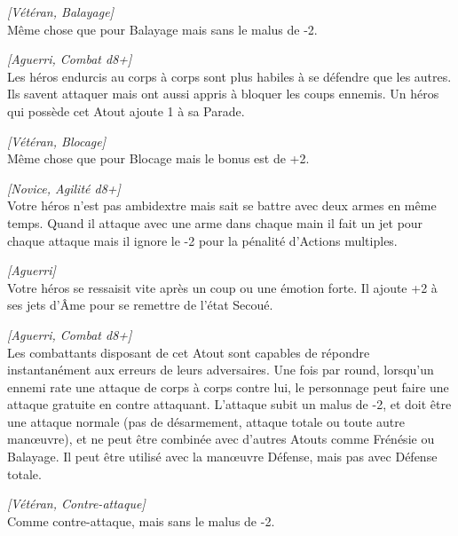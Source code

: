 \begin{description}[align=left]
    \item [Grand balayage]
    	\emph{[Vétéran, Balayage]}\\
        Même chose que pour Balayage mais sans le malus de -2.

    \item [Blocage]
    	\emph{[Aguerri, Combat d8+]}\\
        Les héros endurcis au corps à corps sont plus habiles à se défendre que les autres. Ils savent attaquer mais ont aussi appris à bloquer les coups ennemis. Un héros qui possède cet Atout ajoute 1 à sa Parade.

    \item [Grand blocage]
    	\emph{[Vétéran, Blocage]}\\
        Même chose que pour Blocage mais le bonus est de +2.

    \item [Combat à deux armes]
    	\emph{[Novice, Agilité d8+]}\\
        Votre héros n’est pas ambidextre mais sait se battre avec deux armes en même temps. Quand il attaque avec une arme dans chaque main il fait un jet pour chaque attaque mais il ignore le -2 pour la pénalité d’Actions multiples.

    \item [Combatif]
    	\emph{[Aguerri]}\\
        Votre héros se ressaisit vite après un coup ou une émotion forte. Il ajoute +2 à ses jets d’\^Ame pour se remettre de l’état Secoué.

    \item [Contre-attaque]
    	\emph{[Aguerri, Combat d8+]}\\
        Les combattants disposant de cet Atout sont capables de répondre instantanément aux erreurs de leurs adversaires. Une fois par round, lorsqu’un ennemi rate une attaque de corps à corps contre lui, le personnage peut faire une attaque gratuite en contre attaquant. L’attaque subit un malus de -2, et doit être une attaque normale (pas de désarmement, attaque totale ou toute autre man\oe{uvre}), et ne peut être combinée avec d’autres Atouts comme Frénésie ou Balayage. Il peut être utilisé avec la man\oe{uvre} Défense, mais pas avec Défense totale.

    \item [Grande contre-attaque]
    	\emph{[Vétéran, Contre-attaque]}\\
        Comme contre-attaque, mais sans le malus de -2.


\end{description}
